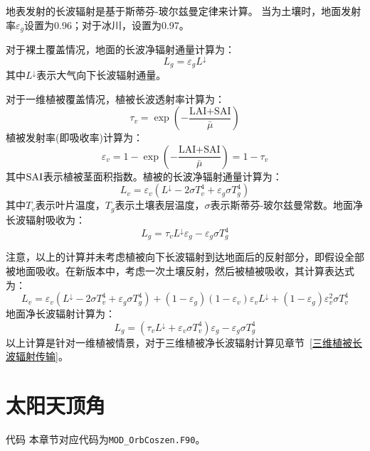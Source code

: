 地表发射的长波辐射是基于斯蒂芬-玻尔兹曼定律来计算。
当为土壤时，地面发射率$\varepsilon_g$设置为0.96；对于冰川，设置为0.97。

对于裸土覆盖情况，地面的长波净辐射通量计算为：
\begin{equation}
L_{g}=\varepsilon_{g} L ^\downarrow
\end{equation}
其中$L ^\downarrow$表示大气向下长波辐射通量。

对于一维植被覆盖情况，植被长波透射率计算为：
\begin{equation}
\tau_{v}=\exp \left(-\frac{\text{LAI+SAI}}{\bar{\mu}}\right)
\end{equation}
植被发射率(即吸收率)计算为：
\begin{equation}
\varepsilon_{v}=1-\exp \left(-\frac{\text{LAI+SAI}}{\bar{\mu}}\right)=1-\tau _v
\end{equation}
其中$\rm SAI$表示植被茎面积指数。植被的长波净辐射通量计算为：
\begin{equation}
L_{v}=\varepsilon_{v}\left(L ^\downarrow-2 \sigma T_{v}^{4}+\varepsilon_{g} \sigma T_{g}^{4}\right)
\end{equation}
其中$T_v$表示叶片温度，$T_g$表示土壤表层温度，$\sigma$表示斯蒂芬-玻尔兹曼常数。地面净长波辐射吸收为：
\begin{equation}\label{eq:lg1}
L_g= \tau_{v} L ^\downarrow \varepsilon_g - \varepsilon_{g} \sigma T_{g}^{4}
\end{equation}

注意，以上的计算并未考虑植被向下长波辐射到达地面后的反射部分，即假设全部被地面吸收。在新版本中，考虑一次土壤反射，然后被植被吸收，其计算表达式为：
\begin{equation}
L_{v}=\varepsilon_{v}\left(L ^\downarrow-2 \sigma T_{v}^{4}+\varepsilon_{g} \sigma T_{g}^{4}\right)+\left(1-\varepsilon_{g}\right)\left(1-\varepsilon_{v}\right) \varepsilon_{v} L ^\downarrow+\left(1-\varepsilon_{g}\right) \varepsilon_{v}^{2} \sigma T_{v}^{4}
\end{equation}
地面净长波辐射计算为：
\begin{equation}\label{eq:lg2}
L_{g}=\left(\tau_{v} L ^\downarrow  + \varepsilon_{v} \sigma T_{v}^{4} \right) \varepsilon_{g} - \varepsilon_{g} \sigma T_{g}^{4}
\end{equation}
以上计算是针对一维植被情景，对于三维植被净长波辐射计算见章节~\ref{三维植被长波辐射传输}。

\section{太阳天顶角}\label{太阳天顶角}
\begin{mymdframed}{代码}
本章节对应代码为\texttt{MOD\_OrbCoszen.F90}。
\end{mymdframed}

